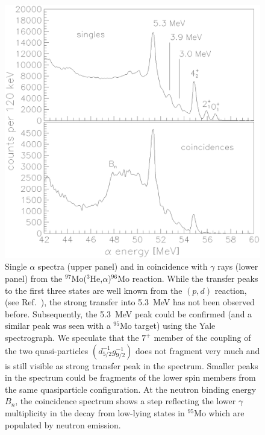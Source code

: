 \clearpage

\begin{figure}\centering
\includegraphics[totalheight=17.9cm]{fig1.eps}
\caption{Single $\alpha$ spectra (upper panel) and in coincidence with $\gamma$
rays (lower panel) from the $^{97}$Mo($^3$He,$\alpha$)$^{96}$Mo reaction. While
the transfer peaks to the first three states are well known from the $(p,d)$ 
reaction, (see Ref.\ \protect\cite{CM73}), the strong transfer into 5.3~MeV has
not been observed before. Subsequently, the 5.3~MeV peak could be confirmed 
(and a similar peak was seen with a $^{95}$Mo target) using the Yale 
spectrograph. We speculate that the $7^+$ member of the coupling of the two 
quasi-particles $(d_{5/2}^{-1}g_{9/2}^{-1})$ \protect\cite{FS73} does not 
fragment very much and is still visible as strong transfer peak in the 
spectrum. Smaller peaks in the spectrum could be fragments of the lower spin 
members from the same quasiparticle configuration. At the neutron binding 
energy $B_n$, the coincidence spectrum shows a step reflecting the lower 
$\gamma$ multiplicity in the decay from low-lying states in $^{95}$Mo which are
populated by neutron emission.}
\label{fig:moraw}
\end{figure}

\clearpage

